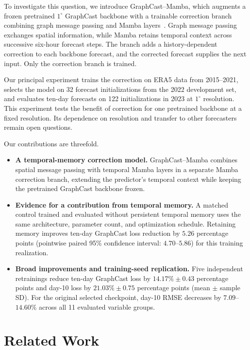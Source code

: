 \documentclass{article}
\newcommand{\vfourchange}[1]{{\color{blue}#1}}
\begin{document}
{To investigate this question, we introduce GraphCast--Mamba, which augments a frozen pretrained $1^\circ$ GraphCast backbone with a trainable correction branch combining graph message passing and Mamba layers~\citep{lam2023graphcast,gu2023mamba}. Graph message passing exchanges spatial information, while Mamba retains temporal context across successive six-hour forecast steps. The branch adds a history-dependent correction to each backbone forecast, and the corrected forecast supplies the next input. Only the correction branch is trained.}

Our principal experiment trains the correction on ERA5 data from 2015--2021\vfourchange{, selects the model on 32 forecast initializations from the 2022 development set,} and evaluates ten-day forecasts on \vfourchange{122 initializations in 2023} at $1^\circ$ resolution. This experiment tests the benefit of correction for one pretrained backbone at a fixed resolution. Its dependence on resolution and transfer to other forecasters remain open questions.

Our contributions are threefold.
\begin{itemize}
    \item \textbf{A temporal-memory correction model.} GraphCast--Mamba combines spatial message passing with temporal Mamba layers in a separate Mamba correction branch, extending the predictor's temporal context while keeping the pretrained GraphCast backbone frozen.
    \item \textbf{Evidence for a contribution from temporal memory.} \vfourchange{A matched control trained and evaluated without persistent temporal memory uses the same architecture, parameter count, and optimization schedule. Retaining memory improves ten-day GraphCast loss reduction by $5.26$ percentage points (pointwise paired 95\% confidence interval: $4.70$--$5.86$) for this training realization.}
    \item \vfourchange{\textbf{Broad improvements and training-seed replication.} Five independent retrainings reduce ten-day GraphCast loss by $14.17\%\pm0.43$ percentage points and day-10 loss by $21.03\%\pm0.75$ percentage points (mean $\pm$ sample SD). For the original selected checkpoint, day-10 RMSE decreases by $7.09$--$14.60\%$ across all 11 evaluated variable groups.}
\end{itemize}

\begingroup
\section{Related Work}
\label{sec:related_work}
\end{document}
